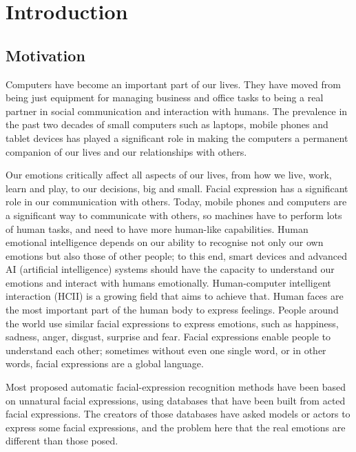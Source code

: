 \chapter{Introduction}
\minitoc



\section{Motivation}
Computers have become an important part of our lives. They have moved from being just equipment for managing business and office tasks to being a real partner in social communication and interaction with humans. The prevalence in the past two decades of small computers such as laptops, mobile phones and tablet devices has played a significant role in making the computers a permanent companion of our lives and our relationships with others. 

Our emotions critically affect all aspects of our lives, from how we live, work, learn and play, to our decisions, big and small. Facial expression has a significant role in our communication with others. 
Today, mobile phones and computers are a significant way to communicate with others, so machines have to perform lots of human tasks, and need to have more human-like capabilities.
Human emotional intelligence depends on our ability to recognise not only our own emotions but also those of other people; to this end, smart devices and advanced AI (artificial intelligence) systems should have the capacity to understand our emotions and interact with humans emotionally. Human-computer intelligent interaction (HCII) is a growing field that aims to achieve that.  
Human faces are the most important part of the human body to express feelings. People around the world use similar facial expressions to express emotions, such as happiness, sadness, anger, disgust, surprise and fear. Facial expressions enable people to understand each other; sometimes without even one single word, or in other words, facial expressions are a global language.

Most proposed automatic facial-expression recognition methods have been based on unnatural facial expressions, using databases that have been built from acted facial expressions. The creators of those databases have asked models or actors to express some facial expressions, and the problem here that the real emotions are different than those posed.


